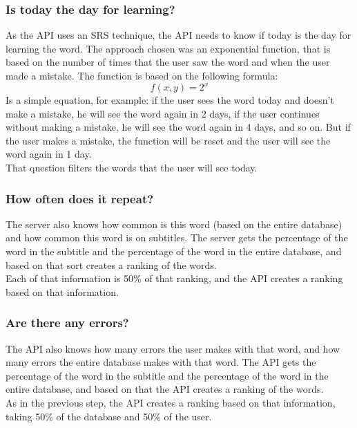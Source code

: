 \documentclass[12pt]{article}
\begin{document}
\subsubsection{Is today the day for learning?}
As the API uses an SRS technique, the API needs to know if today is the day for learning the word. The approach chosen was an exponential function, that is based on the number of times that the user saw the word and when the user made a mistake. The function is based on the following formula:
\begin{equation}
  \label{eq:1}
  f(x, y) = 2^x 
\end{equation}
Is a simple equation, for example: if the user sees the word today and doesn't make a mistake, he will see the word again in 2 days, if the user continues without making a mistake, he will see the word again in 4 days, and so on. But if the user makes a mistake, the function will be reset and the user will see the word again in 1 day. \\
That question filters the words that the user will see today. \\
\subsubsection{How often does it repeat?}
The server also knows how common is this word (based on the entire database) and how common this word is on subtitles. The server gets the percentage of the word in the subtitle and the percentage of the word in the entire database, and based on that sort creates a ranking of the words. \\
Each of that information is 50\% of that ranking, and the API creates a ranking based on that information. \\

\subsubsection{Are there any errors?}
The API also knows how many errors the user makes with that word, and how many errors the entire database makes with that word. The API gets the percentage of the word in the subtitle and the percentage of the word in the entire database, and based on that the API creates a ranking of the words. \\
As in the previous step, the API creates a ranking based on that information, taking 50\% of the database and 50\% of the user. \\
\end{document}
